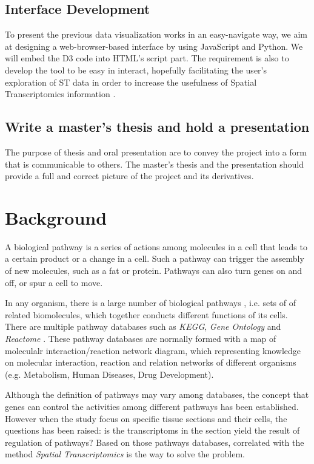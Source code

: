\documentclass[a4paper]{article}
\begin{document}
\subsection{Interface Development}
To present the previous data visualization works in an easy-navigate way, we aim at designing a web-browser-based interface by using JavaScript and Python. We  will embed the D3 code into HTML's script part. The requirement is also to develop the tool to be easy in interact, hopefully facilitating the user's exploration of ST data in order to increase the usefulness of Spatial Transcriptomics information \cite{ST}.

\subsection{Write a master's thesis and hold a presentation}
The purpose of thesis and oral presentation are to convey the project into a form that is communicable to others. The master's thesis and the presentation should provide a full and correct picture of the project and its derivatives. 


\section{Background}
A biological pathway is a series of actions among molecules in a cell that leads to a certain product or a change in a cell.\cite{NHGRI} Such a pathway can trigger the assembly of new molecules, such as a fat or protein. Pathways can also turn genes on and off, or spur a cell to move.

In any organism, there is a large number of biological pathways , i.e. sets of of related biomolecules, which together conducts different functions of its cells. There are multiple pathway databases such as \textit{KEGG}\cite{KEGG}, \textit{Gene Ontology} \cite{GENE} and \textit{Reactome} \cite{RE}. These pathway databases are normally formed with a map of moleculalr interaction/reaction network diagram, which representing knowledge on molecular interaction, reaction and relation networks of different organisms \cite{KEGG} (e.g. Metabolism, Human Diseases, Drug Development).

Although the definition of pathways may vary among databases, the concept that genes can control the activities among different pathways has been established. However when the study focus on specific tissue sections and their cells, the questions has been raised: is the transcriptoms in the section yield the result of regulation of pathways? Based on those pathways databases, correlated with the method \textit{Spatial Transcriptomics} is the way to solve the problem.
\end{document}
